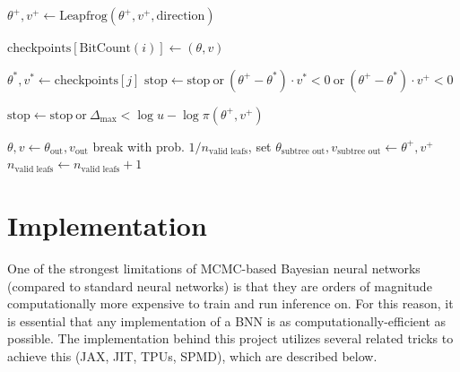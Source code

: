 \documentclass[12pt]{article}
\begin{document}
{\begin{algorithm}
\begin{algorithmic}
		\State $\theta^+, v^+ \gets \textrm{Leapfrog}(\theta^+, v^+, \textrm{direction})$ 
		
		 
			\State $\textrm{checkpoints}[\textrm{BitCount}(i)] \gets (\theta, v)$
		
		 
				\State $\theta^*, v^* \gets \textrm{checkpoints}[j]$
				\State $\textrm{stop} \gets \textrm{stop} \ \textrm{or} \ (\theta^+ - \theta^*) \cdot v^* < 0 \ \textrm{or} \ (\theta^+ - \theta^*) \cdot v^+ < 0$
		    \EndFor
		\EndIf
		
		\State $\textrm{stop} \gets \textrm{stop} \ \textrm{or} \ \Delta_\mathrm{max} < \log u - \log \pi(\theta^+, v^+)$ 
			
			\State $\theta, v \gets \theta_\textrm{out}, v_\textrm{out}$ 
			\State break
		\Else
			 
				\State with prob. $1/n_\textrm{valid leafs}$, set $\theta_\textrm{subtree out}, v_\textrm{subtree out} \gets \theta^+, v^+$ 
				\State $n_\textrm{valid leafs} \gets n_\textrm{valid leafs} + 1$
			\EndIf
		\EndIf
		
	\EndFor
\EndFor
\end{algorithmic}
\end{algorithm}

\section{Implementation}

One of the strongest limitations of MCMC-based Bayesian neural networks (compared to standard neural networks) is that they are orders of magnitude computationally more expensive to train and run inference on. For this reason, it is essential that any implementation of a BNN is as computationally-efficient as possible. The implementation behind this project utilizes several related tricks to achieve this (JAX, JIT, TPUs, SPMD), which are described below.

}
\end{document}
